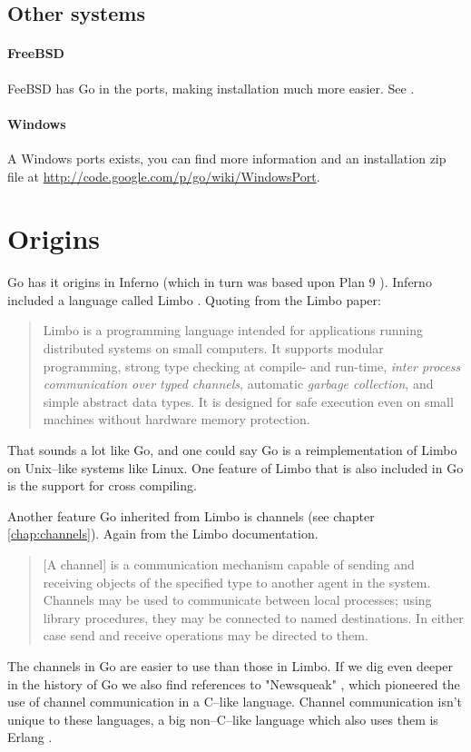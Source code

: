 \subsection{Other systems}
\paragraph{FreeBSD} FeeBSD has Go in the ports, making installation much more easier.
See .

\paragraph{Windows} A Windows ports exists, you can find more information and
an installation zip file at \url{http://code.google.com/p/go/wiki/WindowsPort}.

\section{Origins}
Go has it origins in Inferno \cite{inferno} (which in turn was based
upon Plan 9 \cite{plan9}). Inferno included a language called Limbo
\cite{limbo}. Quoting from the Limbo paper:
\begin{quote}
Limbo is a programming language intended for applications running
distributed systems on small computers. It supports modular programming,
strong type checking at compile- and run-time, \emph{inter process
communication over typed channels}, automatic \emph{garbage collection}, and
simple abstract data types. It is designed for safe execution even on
small machines without hardware memory protection.
\end{quote}
That sounds a lot like Go, and one could say Go is a reimplementation of
Limbo on Unix--like systems like Linux. One feature of Limbo that is
also included in Go is the support for cross compiling.

Another feature Go inherited from Limbo is channels (see chapter
\ref{chap:channels}). Again from the Limbo documentation.
\begin{quote}
[A channel] is a communication mechanism capable of sending and receiving objects of
the specified type to another agent in the system. Channels may be used
to communicate between local processes; using library procedures, they
may be connected to named destinations. In either case send and receive
operations may be directed to them.
\end{quote}
The channels in Go are easier to use than those in Limbo.
If we dig even deeper in the history of Go we also find references
to "Newsqueak" \cite{newsqueak}, which pioneered the use of 
channel communication in a C--like language. Channel
communication isn't unique to these languages, a big non--C--like
language which also uses them is Erlang \cite{erlang}.

